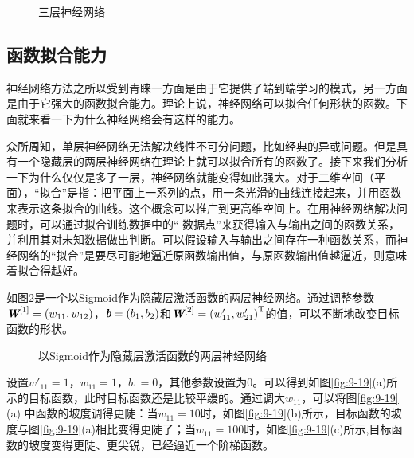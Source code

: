 \begin{figure}[htp]
\centering

\caption{三层神经网络}
\label{fig:9-17}
\end{figure}


\subsection{函数拟合能力}

\parinterval 神经网络方法之所以受到青睐一方面是由于它提供了端到端学习的模式，另一方面是由于它强大的函数拟合能力。理论上说，神经网络可以拟合任何形状的函数。下面就来看一下为什么神经网络会有这样的能力。

\parinterval 众所周知，单层神经网络无法解决线性不可分问题，比如经典的异或问题。但是具有一个隐藏层的两层神经网络在理论上就可以拟合所有的函数了。接下来我们分析一下为什么仅仅是多了一层，神经网络就能变得如此强大。对于二维空间（平面），“拟合”是指：把平面上一系列的点，用一条光滑的曲线连接起来，并用函数来表示这条拟合的曲线。这个概念可以推广到更高维空间上。在用神经网络解决问题时，可以通过拟合训练数据中的“ 数据点”来获得输入与输出之间的函数关系，并利用其对未知数据做出判断。可以假设输入与输出之间存在一种函数关系，而神经网络的“拟合”是要尽可能地逼近原函数输出值，与原函数输出值越逼近，则意味着拟合得越好。


\parinterval 如图\ref{fig:9-18}是一个以Sigmoid作为隐藏层激活函数的两层神经网络。通过调整参数$ {\textbf{\em W}}^{[1]}=(w_{11},w_{12}) $，$ {\textbf{\em b}}=(b_1,b_2) $和$ {\textbf{\em W}}^{[2]}={(w'_{11},w'_{21})}^{\textrm{T}} $的值，可以不断地改变目标函数的形状。


\begin{figure}[htp]
\centering

\caption{以Sigmoid作为隐藏层激活函数的两层神经网络}
\label{fig:9-18}
\end{figure}

\parinterval 设置$ w'_{11}=1 $，$ w_{11}=1 $，$ b_1=0 $，其他参数设置为0。可以得到如图\ref{fig:9-19}(a)所示的目标函数，此时目标函数还是比较平缓的。通过调大$ w_{11} $，可以将图\ref{fig:9-19}(a) 中函数的坡度调得更陡：当$ w_{11}=10 $时，如图\ref{fig:9-19}(b)所示，目标函数的坡度与图\ref{fig:9-19}(a)相比变得更陡了；当$ w_{11}=100 $时，如图\ref{fig:9-19}(c)所示,目标函数的坡度变得更陡、更尖锐，已经逼近一个阶梯函数。

